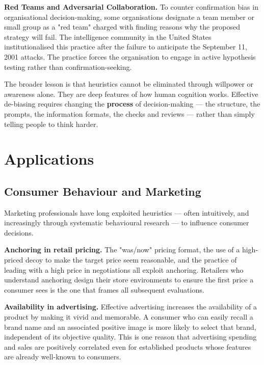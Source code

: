 \documentclass[12pt, letterpaper]{article}
\begin{document}
\textbf{Red Teams and Adversarial Collaboration.} To counter confirmation bias in organisational decision-making, some organisations designate a team member or small group as a "red team" charged with finding reasons why the proposed strategy will fail. The intelligence community in the United States institutionalised this practice after the failure to anticipate the September 11, 2001 attacks. The practice forces the organisation to engage in active hypothesis testing rather than confirmation-seeking.

The broader lesson is that heuristics cannot be eliminated through willpower or awareness alone. They are deep features of how human cognition works. Effective de-biasing requires changing the \textbf{process} of decision-making --- the structure, the prompts, the information formats, the checks and reviews --- rather than simply telling people to think harder.

\medskip


\section{Applications}



\subsection{Consumer Behaviour and Marketing}


Marketing professionals have long exploited heuristics --- often intuitively, and increasingly through systematic behavioural research --- to influence consumer decisions.

\textbf{Anchoring in retail pricing.} The "was/now" pricing format, the use of a high-priced decoy to make the target price seem reasonable, and the practice of leading with a high price in negotiations all exploit anchoring. Retailers who understand anchoring design their store environments to ensure the first price a consumer sees is the one that frames all subsequent evaluations.

\textbf{Availability in advertising.} Effective advertising increases the availability of a product by making it vivid and memorable. A consumer who can easily recall a brand name and an associated positive image is more likely to select that brand, independent of its objective quality. This is one reason that advertising spending and sales are positively correlated even for established products whose features are already well-known to consumers.
\end{document}
